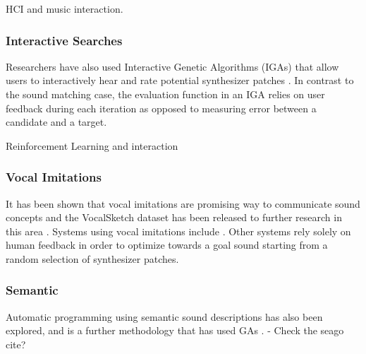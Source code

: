 \cite{holland2013music} HCI and music interaction.

\subsubsection{Interactive Searches}
Researchers have also used Interactive Genetic Algorithms (IGAs) that allow users to interactively hear and rate potential synthesizer patches \cite{johnson1999exploring, dahlstedt2001creating, yee2016use}. In contrast to the sound matching case, the evaluation function in an IGA relies on user feedback during each iteration as opposed to measuring error between a candidate and a target. 

Reinforcement Learning and interaction \cite{scurto2021designing}

 \subsubsection{Vocal Imitations}
 It has been shown that vocal imitations are promising way to communicate sound concepts \cite{lemaitre2014effectiveness} and the VocalSketch dataset has been released to further research in this area \cite{cartwright2015vocalsketch}. Systems using vocal imitations include \cite{mcartwright2014}\cite{zhang2018visualization}. Other systems rely solely on human feedback in order to optimize towards a goal sound starting from a random selection of synthesizer patches. 
 
 \subsubsection{Semantic}
 Automatic programming using semantic sound descriptions has also been explored, and is a further methodology that has used GAs \cite{krekovic2016algorithm}.
 - Check the seago cite?